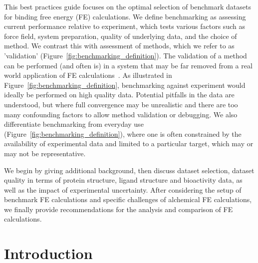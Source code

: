 \documentclass[9pt,bestpractices]{livecoms}
\begin{document}
This best practices guide focuses on the optimal selection of benchmark datasets for binding free energy (FE) calculations. We define benchmarking as assessing current performance relative to experiment, which tests various factors such as force field, system preparation, quality of underlying data, and the choice of method. We contrast this with assessment of methods, which we refer to as 'validation' (Figure~\ref{fig:benchmarking_definition}). The validation of a method can be performed (and often is) in a system that may be far removed from a real world application of FE calculations~\cite{mobleyPredictingBindingFree2017}. 
As illustrated in Figure~\ref{fig:benchmarking_definition}, benchmarking against experiment would ideally be performed on high quality data. Potential pitfalls in the data are understood, but where full convergence may be unrealistic and there are too many confounding factors to allow method validation or debugging. We also differentiate benchmarking from everyday use (Figure~\ref{fig:benchmarking_definition}), where one is often constrained by the availability of experimental data and limited to a particular target, which may or may not be representative. 

We begin by giving additional background, then discuss dataset selection, dataset quality in terms of protein structure, ligand structure and bioactivity data, as well as the impact of experimental uncertainty. 
After considering the setup of benchmark FE calculations and specific challenges of alchemical FE calculations, we finally provide recommendations for the analysis and comparison of FE calculations.

\section{Introduction}
\end{document}
